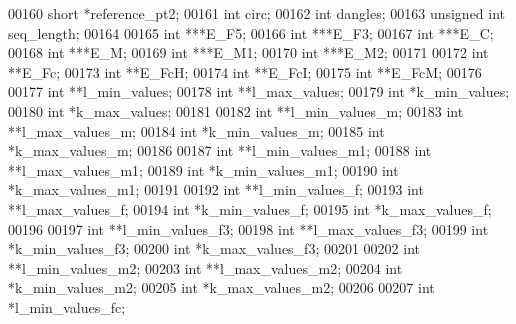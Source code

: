 \begin{DoxyCode}
00160   \textcolor{keywordtype}{short}           *reference\_pt2;
00161   \textcolor{keywordtype}{int}             circ;
00162   \textcolor{keywordtype}{int}             dangles;
00163   \textcolor{keywordtype}{unsigned} \textcolor{keywordtype}{int}    seq\_length;
00164 
00165   \textcolor{keywordtype}{int}             ***E\_F5;
00166   \textcolor{keywordtype}{int}             ***E\_F3;
00167   \textcolor{keywordtype}{int}             ***E\_C;
00168   \textcolor{keywordtype}{int}             ***E\_M;
00169   \textcolor{keywordtype}{int}             ***E\_M1;
00170   \textcolor{keywordtype}{int}             ***E\_M2;
00171 
00172   \textcolor{keywordtype}{int}             **E\_Fc;
00173   \textcolor{keywordtype}{int}             **E\_FcH;
00174   \textcolor{keywordtype}{int}             **E\_FcI;
00175   \textcolor{keywordtype}{int}             **E\_FcM;
00176 
00177   \textcolor{keywordtype}{int}             **l\_min\_values;
00178   \textcolor{keywordtype}{int}             **l\_max\_values;
00179   \textcolor{keywordtype}{int}             *k\_min\_values;
00180   \textcolor{keywordtype}{int}             *k\_max\_values;
00181 
00182   \textcolor{keywordtype}{int}             **l\_min\_values\_m;
00183   \textcolor{keywordtype}{int}             **l\_max\_values\_m;
00184   \textcolor{keywordtype}{int}             *k\_min\_values\_m;
00185   \textcolor{keywordtype}{int}             *k\_max\_values\_m;
00186 
00187   \textcolor{keywordtype}{int}             **l\_min\_values\_m1;
00188   \textcolor{keywordtype}{int}             **l\_max\_values\_m1;
00189   \textcolor{keywordtype}{int}             *k\_min\_values\_m1;
00190   \textcolor{keywordtype}{int}             *k\_max\_values\_m1;
00191 
00192   \textcolor{keywordtype}{int}             **l\_min\_values\_f;
00193   \textcolor{keywordtype}{int}             **l\_max\_values\_f;
00194   \textcolor{keywordtype}{int}             *k\_min\_values\_f;
00195   \textcolor{keywordtype}{int}             *k\_max\_values\_f;
00196 
00197   \textcolor{keywordtype}{int}             **l\_min\_values\_f3;
00198   \textcolor{keywordtype}{int}             **l\_max\_values\_f3;
00199   \textcolor{keywordtype}{int}             *k\_min\_values\_f3;
00200   \textcolor{keywordtype}{int}             *k\_max\_values\_f3;
00201 
00202   \textcolor{keywordtype}{int}             **l\_min\_values\_m2;
00203   \textcolor{keywordtype}{int}             **l\_max\_values\_m2;
00204   \textcolor{keywordtype}{int}             *k\_min\_values\_m2;
00205   \textcolor{keywordtype}{int}             *k\_max\_values\_m2;
00206 
00207   \textcolor{keywordtype}{int}             *l\_min\_values\_fc;

\end{DoxyCode}
